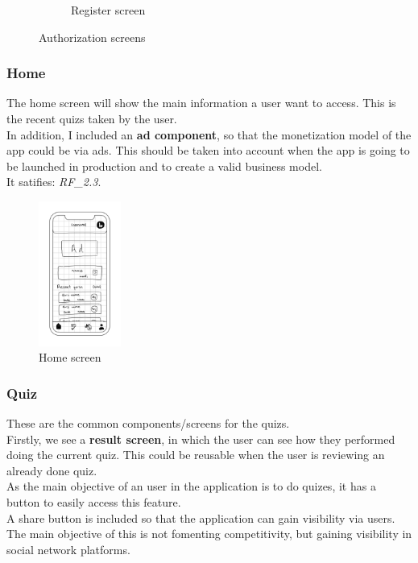 \begin{figure}[H]
\begin{subfigure}[T]{0.49\textwidth}
        \caption{Register screen}
        \label{fig:design_screen_camera_register}
    \end{subfigure}
       \caption{Authorization screens}
       \label{fig:design_screens_auth}
\end{figure}

\subsubsection{Home}
The home screen will show the main information a user want to access. This is the recent quizs taken by the user. \\

In addition, I included an \textbf{ad component}, so that the monetization model of the app could be via ads. This should be taken into account when the app is going to be launched in production and to create a valid business model.\\

It satifies: \textit{RF\_2.3}. \\
\begin{figure}[H]
    \centering
        \includegraphics[width=0.24\textwidth]{assets/screens/Home.png}
    \caption{Home screen}
    \label{fig:design_home}
\end{figure}

\subsubsection{Quiz}
These are the common components/screens for the quizs. \\

Firstly, we see a \textbf{result screen}, in which the user can see how they performed doing the current quiz. This could be reusable when the user is reviewing an already done quiz. \\
As the main objective of an user in the application is to do quizes, it has a button to easily access this feature. \\
A share button is included so that the application can gain visibility via users. The main objective of this is not fomenting competitivity, but gaining visibility in social network platforms. \\

